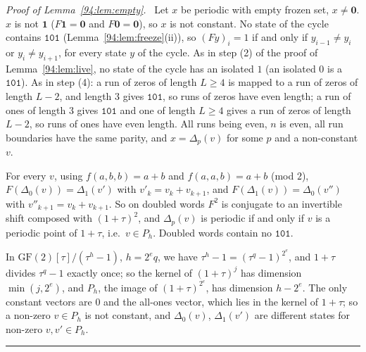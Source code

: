 \documentclass[10pt,a4paper]{article}
\newcommand{\qedmark}{\rule{1.1ex}{1.1ex}}
\newenvironment{proof}[1][Proof]{\par\smallskip\noindent\textit{#1.}\ }{\hfill\qedmark\par\smallskip}
\newcommand{\zero}{\mathbf{0}}                %
\newcommand{\one}{\mathbf{1}}                 %
\newcommand{\code}[1]{\mathtt{#1}}            %
\begin{document}
\begin{proof}[Proof of Lemma~\ref{94:lem:empty}]
Let $x$ be periodic with empty frozen set, $x\ne\zero$. $x$ is not $\one$ ($F\one=\zero$ and $F\zero=\zero$), so
$x$ is not constant. No state of the cycle contains $\code{101}$ (Lemma~\ref{94:lem:freeze}(ii)), so
$(Fy)_i=1$ if and only if $y_{i-1}\ne y_i$ or $y_i\ne y_{i+1}$, for every state $y$ of the cycle. As in step (2)
of the proof of Lemma~\ref{94:lem:live}, no state of the cycle has an isolated $1$ (an isolated $0$ is a
$\code{101}$). As in step (4): a run of zeros of length $L\ge4$ is mapped to a run of zeros of length $L-2$, and
length $3$ gives $\code{101}$, so runs of zeros have even length; a run of ones of length $3$ gives $\code{101}$
and one of length $L\ge4$ gives a run of zeros of length $L-2$, so runs of ones have even length. All runs being
even, $n$ is even, all run boundaries have the same parity, and $x=\Delta_p(v)$ for some $p$ and a non-constant
$v$.

For every $v$, using $f(a,b,b)=a+b$ and $f(a,a,b)=a+b$ (mod $2$), $F(\Delta_0(v))=\Delta_1(v')$ with
$v'_k=v_k+v_{k+1}$, and $F(\Delta_1(v))=\Delta_0(v'')$ with $v''_{k+1}=v_k+v_{k+1}$. So on doubled words $F^2$ is
conjugate to an invertible shift composed with $(1+\tau)^2$, and $\Delta_p(v)$ is periodic if and only if $v$ is a
periodic point of $1+\tau$, i.e.\ $v\in P_h$. Doubled words contain no $\code{101}$.

In $\mathrm{GF}(2)[\tau]/(\tau^h-1)$, $h=2^eq$, we have $\tau^h-1=(\tau^q-1)^{2^e}$, and $1+\tau$ divides
$\tau^q-1$ exactly once; so the kernel of $(1+\tau)^j$ has dimension $\min(j,2^e)$, and $P_h$, the image of
$(1+\tau)^{2^e}$, has dimension $h-2^e$. The only constant vectors are $0$ and the all-ones vector, which lies in
the kernel of $1+\tau$; so a non-zero $v\in P_h$ is not constant, and $\Delta_0(v)$, $\Delta_1(v')$ are different
states for non-zero $v,v'\in P_h$.
\end{proof}
\end{document}
